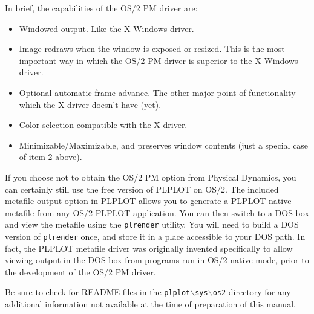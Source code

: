 In brief, the capabilities of the OS/2 PM driver are:
\begin{itemize}

\item	Windowed output.  Like the X Windows driver.

\item	Image redraws when the window is exposed or resized.  This is the most
	important way in which the OS/2 PM driver is superior to the
        X Windows driver.

\item	Optional automatic frame advance.  The other major point of 
	functionality which the X driver doesn't have  (yet).
        
\item	Color selection compatible with the X driver.

\item	Minimizable/Maximizable, and preserves window contents  (just a
	special case of item 2 above).

\end{itemize}

If you choose not to obtain the OS/2 PM option  from Physical Dynamics, you
can certainly still use the free version of PLPLOT on OS/2.  The included 
metafile output option in PLPLOT allows you to generate a PLPLOT native
metafile from any OS/2 PLPLOT application.  You can then switch to a DOS box
and view the metafile using the {\tt plrender} utility.  You will need to
build a DOS version of {\tt plrender} once, and store it in a place accessible 
to your DOS path.  In fact, the PLPLOT metafile driver was originally invented 
specifically to allow viewing output in the DOS box from programs run in
OS/2 native mode, prior to the development of the OS/2 PM driver.

Be sure to check for README files in the 
{\tt plplot$\backslash$sys$\backslash$os2} directory for any additional
information not available at the time of preparation of this manual.
